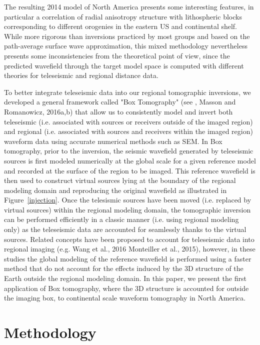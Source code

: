 \documentclass[12pt]{article}
\begin{document}
The resulting 2014 model of North America presents some interesting features, in particular a correlation of radial anisotropy structure with lithospheric blocks corresponding to different orogenies in the eastern US and continental shelf. 
While more rigorous than inversions practiced by most groups and based on the path-average surface wave approximation, this mixed methodology nevertheless presents some inconsistencies from the theoretical point of view, since the predicted wavefield through the target model space is computed with different theories for teleseismic and regional distance data.

 To better integrate teleseismic data into our regional tomographic inversions, we developed a general framework called "Box Tomography"  (see \cite{masson2013numerical}, Masson and Romanowicz, 2016a,b) that allow us to consistently model and invert both teleseismic (i.e. associated with sources or receivers outside of the imaged region) and regional (i.e. associated with sources and receivers within the imaged region) waveform data using accurate numerical methods such as SEM. In Box tomography, prior to the inversion, the seismic wavefield generated by teleseismic sources is first modeled numerically at the global scale for a given reference model and recorded at the surface of the region to be imaged.  This reference wavefield is then used to construct virtual sources lying at the boundary of the regional modeling domain and reproducing the original wavefield as illustrated in Figure~\ref{injection}. Once the telesismic sources have been moved (i.e. replaced by virtual sources) within the regional modeling domain, the tomographic inversion can be performed efficiently in a classic manner (i.e. using regional modeling only) as the teleseismic data are accounted for seamlessly thanks to the virtual sources. Related concepts have been proposed to account for teleseismic data into regional imaging (e.g. Wang et al., 2016 Monteiller et al., 2015), however, in these studies the global modeling of the reference wavefield is performed using a faster method that do not account for the effects induced by the 3D structure of the Earth outside the regional modeling domain. In this paper, we present the first application of Box tomography, where the 3D structure is accounted for outside the imaging box, to continental scale waveform tomography in North America.

\section{Methodology}
\end{document}
